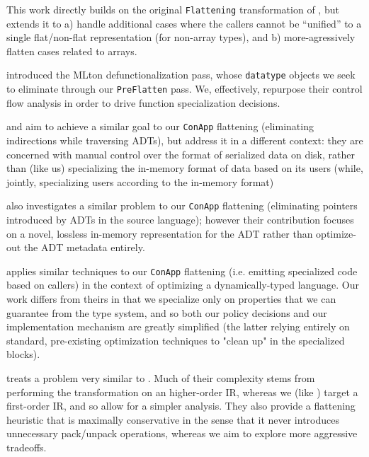 \documentclass[leqno,11pt]{article}
\begin{document}
This work directly builds on the original \texttt{Flattening} transformation of
\cite{flat-paper}, but extends it to a) handle additional cases where the
callers cannot be ``unified'' to a single flat/non-flat representation (for
non-array types), and b) more-agressively flatten cases related to arrays.


\cite{mlton-closure-paper} introduced the MLton defunctionalization pass, whose \texttt{datatype} objects we seek to eliminate through our \texttt{PreFlatten} pass. We, effectively, repurpose their control flow analysis in order to drive function specialization decisions.

\cite{local-paper} and \cite{adt4hpc-paper} aim to achieve a similar goal to our \texttt{ConApp} flattening (eliminating indirections while traversing ADTs), but address it in a different context: they are concerned with manual control over the format of serialized data on disk, rather than (like us) specializing the in-memory format of data based on its users (while, jointly, specializing users according to the in-memory format)

\cite{double-steal-paper} also investigates a similar problem to our \texttt{ConApp} flattening (eliminating pointers introduced by ADTs in the source language); however their contribution focuses on a novel, lossless in-memory representation for the ADT rather than optimize-out the ADT metadata entirely.

\cite{bbv-paper} applies similar techniques to our \texttt{ConApp} flattening (i.e. emitting specialized code based on callers) in the context of optimizing a dynamically-typed language. Our work differs from theirs in that we specialize only on properties that we can guarantee from the type system, and so both our policy decisions and our implementation mechanism are greatly simplified (the latter relying entirely on standard, pre-existing optimization techniques to "clean up" in the specialized blocks).

\cite{manticore-arity-paper} treats a problem very similar to \cite{flat-paper}. Much of their complexity stems from performing the transformation on an higher-order IR, whereas we (like \cite{flat-paper}) target a first-order IR, and so allow for a simpler analysis. They also provide a flattening heuristic that is maximally conservative in the sense that it never introduces unnecessary pack/unpack operations, whereas we aim to explore more aggressive tradeoffs.
\end{document}
